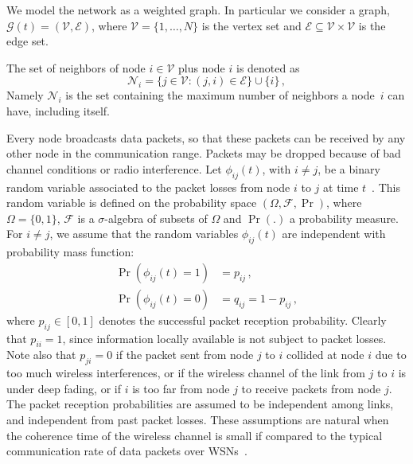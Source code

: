 \documentclass[a4paper,notitlepage,onecolumn]{article}
\numberwithin{equation}{section}
\begin{document}
We model the network as a weighted graph. In particular we consider
a graph, $\mathcal{G}(t)=(\mathcal{V},\mathcal{E})$, where
$\mathcal{V}=\{1,\dots,N\}$ is the vertex set and
$\mathcal{E}\subseteq \mathcal{V}\times\mathcal{V}$ is the edge set.


The set of neighbors of node $i\in\mathcal{V}$ plus node $i$ is
denoted as
$$
    \mathcal{N}_i=\{j \in \mathcal{V} :
    (j,i)\in\mathcal{E}\}\cup\{i\}\,,
$$
Namely $\mathcal{N}_i$ is the set containing the maximum number of
neighbors a node~$i$ can have, including itself.


Every node broadcasts data packets, so that these packets can be
received by any other node in the communication range. Packets may
be dropped because of bad channel conditions or radio
interference. Let $\phi_{ij}(t)$, with $i\neq j$, be a binary
random variable associated to the packet losses from node $i$ to
$j$ at time $t$~\cite{Stuber}. This random variable is defined on
the probability space $(\Omega,\mathcal{F},\Pr)$, where
$\Omega=\{0,1\}$, $\mathcal{F}$ is a $\sigma$-algebra of subsets
of $\Omega$ and $\Pr(.)$ a probability measure. For $i\neq j$, we
assume that the random variables $\phi_{ij}(t)$ are independent
with probability mass function:
\begin{align*}
    \Pr(\phi_{ij}(t)=1) &= p_{ij} \,,\\
    \Pr(\phi_{ij}(t)=0) &= q_{ij} = 1-p_{ij} \,,
\end{align*}
where $p_{ij}\in[0,1]$ denotes the successful packet reception
probability. Clearly that $p_{ii}=1$, since information locally
available is not subject to packet losses. Note also that
$p_{ji}=0$ if the packet sent from node $j$ to $i$ collided at
node $i$ due to too much wireless interferences, or if the
wireless channel of the link from $j$ to $i$ is under deep fading,
or if $i$ is too far from node $j$ to receive packets from node
$j$. The packet reception probabilities are assumed to be
independent among links, and independent from past packet losses.
These assumptions are natural when the coherence time of the
wireless channel is small if compared to the typical communication
rate of data packets over WSNs~\cite{Stuber,ieee802154}.
\end{document}
